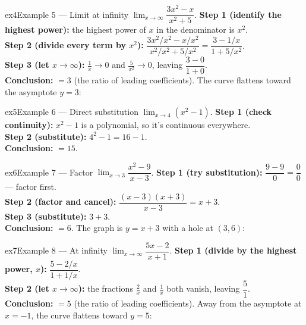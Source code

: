 \documentclass[11pt]{article}
\begin{document}
\begin{example}{ex4}{Example 5 --- Limit at infinity}
$\displaystyle\lim_{x\to\infty}\dfrac{3x^2-x}{x^2+5}$.\soln
\textbf{Step 1 (identify the highest power):} the highest power of $x$ in the denominator is $x^2$.\\[3pt]
\textbf{Step 2 (divide every term by $x^2$):} $\dfrac{3x^2/x^2-x/x^2}{x^2/x^2+5/x^2}=\dfrac{3-1/x}{1+5/x^2}$.\\[3pt]
\textbf{Step 3 (let $x\to\infty$):} $\tfrac1x\to0$ and $\tfrac5{x^2}\to0$, leaving $\dfrac{3-0}{1+0}$.\\[3pt]
\textbf{Conclusion:} $=3$ (the ratio of leading coefficients). The curve flattens toward the asymptote $y=3$:
\end{example}

\begin{example}{ex5}{Example 6 --- Direct substitution}
$\displaystyle\lim_{x\to4}(x^2-1)$.\soln
\textbf{Step 1 (check continuity):} $x^2-1$ is a polynomial, so it's continuous everywhere.\\[3pt]
\textbf{Step 2 (substitute):} $4^2-1=16-1$.\\[3pt]
\textbf{Conclusion:} $=15$.
\end{example}

\begin{example}{ex6}{Example 7 --- Factor}
$\displaystyle\lim_{x\to3}\dfrac{x^2-9}{x-3}$.\soln
\textbf{Step 1 (try substitution):} $\dfrac{9-9}{0}=\dfrac00$ --- factor first.\\[3pt]
\textbf{Step 2 (factor and cancel):} $\dfrac{(x-3)(x+3)}{x-3}=x+3$.\\[3pt]
\textbf{Step 3 (substitute):} $3+3$.\\[3pt]
\textbf{Conclusion:} $=6$. The graph is $y=x+3$ with a hole at $(3,6)$:
\end{example}

\begin{example}{ex7}{Example 8 --- At infinity}
$\displaystyle\lim_{x\to\infty}\dfrac{5x-2}{x+1}$.\soln
\textbf{Step 1 (divide by the highest power, $x$):} $\dfrac{5-2/x}{1+1/x}$.\\[3pt]
\textbf{Step 2 (let $x\to\infty$):} the fractions $\tfrac2x$ and $\tfrac1x$ both vanish, leaving $\dfrac{5}{1}$.\\[3pt]
\textbf{Conclusion:} $=5$ (the ratio of leading coefficients). Away from the asymptote at $x=-1$, the curve flattens toward $y=5$:
\end{example}
\end{document}
